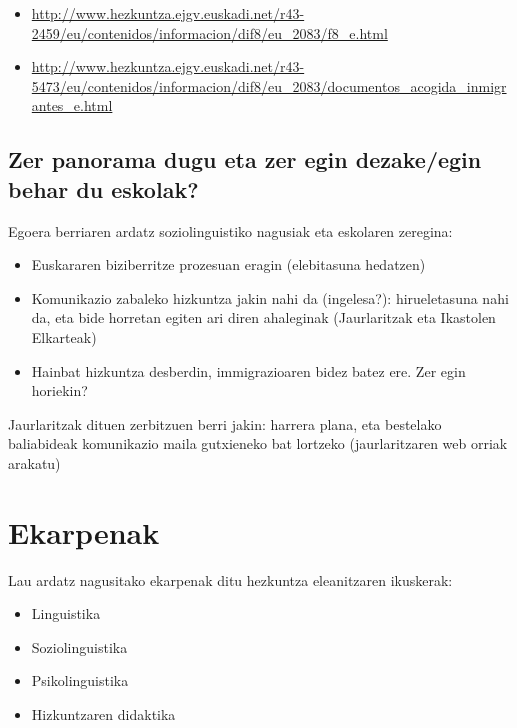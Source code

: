 \documentclass[
]{book}
\providecommand{\tightlist}{%
  \setlength{\itemsep}{0pt}\setlength{\parskip}{0pt}}
\begin{document}
\begin{itemize}
\tightlist
\item
  \url{http://www.hezkuntza.ejgv.euskadi.net/r43-2459/eu/contenidos/informacion/dif8/eu_2083/f8_e.html}~\\
\item
  \url{http://www.hezkuntza.ejgv.euskadi.net/r43-5473/eu/contenidos/informacion/dif8/eu_2083/documentos_acogida_inmigrantes_e.html}
\end{itemize}

\hypertarget{zer-panorama-dugu-eta-zer-egin-dezakeegin-behar-du-eskolak}{%
\subsection{Zer panorama dugu eta zer egin dezake/egin behar du eskolak?}\label{zer-panorama-dugu-eta-zer-egin-dezakeegin-behar-du-eskolak}}

Egoera berriaren ardatz soziolinguistiko nagusiak eta eskolaren zeregina:

\begin{itemize}
\tightlist
\item
  Euskararen biziberritze prozesuan eragin (elebitasuna hedatzen)
\item
  Komunikazio zabaleko hizkuntza jakin nahi da (ingelesa?): hirueletasuna nahi da, eta bide horretan egiten ari diren ahaleginak (Jaurlaritzak eta Ikastolen Elkarteak)
\item
  Hainbat hizkuntza desberdin, immigrazioaren bidez batez ere. Zer egin horiekin?
\end{itemize}

Jaurlaritzak dituen zerbitzuen berri jakin: harrera plana, eta bestelako baliabideak komunikazio maila gutxieneko bat lortzeko (jaurlaritzaren web orriak arakatu)

\hypertarget{ekarpenak}{%
\section{Ekarpenak}\label{ekarpenak}}

Lau ardatz nagusitako ekarpenak ditu hezkuntza eleanitzaren ikuskerak:

\begin{itemize}
\tightlist
\item
  Linguistika
\item
  Soziolinguistika
\item
  Psikolinguistika
\item
  Hizkuntzaren didaktika
\end{itemize}
\end{document}

